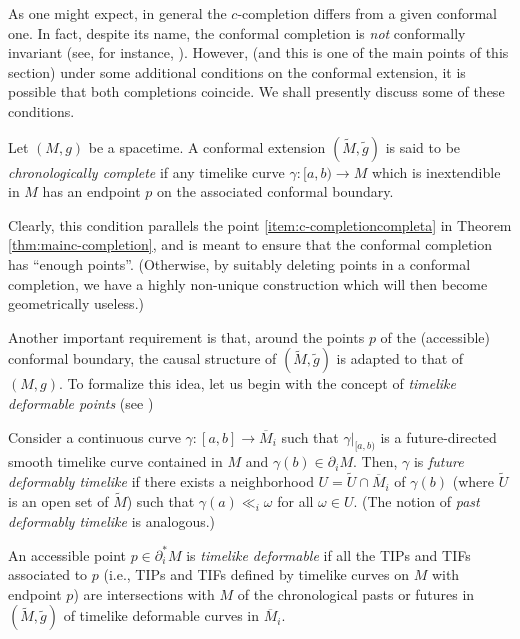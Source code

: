 \medskip

As one might expect, in general the $c$-completion differs from a given conformal one. In fact, despite its name, the conformal completion is {\em not} conformally invariant (see, for instance, \cite[Figure 10]{Floresfinaldefinitioncausal2011}). However, (and this is one of the main points of this section) under some additional conditions on the conformal extension, it is possible that both completions coincide. We shall presently discuss some of these conditions.

\begin{definition}\label{def:chronologically complete}
Let $(M,g)$ be a spacetime. A conformal extension $(\tilde{M},\tilde{g})$ is said to be {\em chronologically complete} if any timelike curve $\gamma:[a,b)\rightarrow M$ which is inextendible in $M$ has an endpoint $p$ on the associated conformal boundary.
\end{definition}
Clearly, this condition parallels the point \ref{item:c-completioncompleta} in Theorem  \ref{thm:mainc-completion}, and is meant to ensure that the conformal completion has ``enough points''. (Otherwise, by suitably deleting points in a conformal completion, we have a highly non-unique construction which will then become geometrically useless.)

Another important requirement is that, around the points $p$ of the (accessible) conformal boundary, the causal structure of $(\tilde{M},\tilde{g})$ is adapted to that of $(M,g)$. To formalize this idea, let us begin with the concept of {\em timelike deformable points} (see \cite[Definition 4.10]{Floresfinaldefinitioncausal2011})

\begin{definition}\label{def:deformable}
Consider a continuous curve $\gamma:[a,b]\rightarrow \overline{M}_i$ such that $\gamma|_{[a,b)}$ is a future-directed smooth timelike curve contained in $M$ and $\gamma(b)\in \partial_i M$. Then, $\gamma$ is {\em future deformably timelike} if there exists a neighborhood $U=\tilde{U}\cap \overline{M}_i$ of $\gamma(b)$ (where $\tilde{U}$ is an open set of $\tilde{M}$) such that $\gamma(a)\ll_i \omega$ for all $\omega\in U$. (The notion of {\em past deformably timelike} is analogous.)

  An accessible point $p\in \partial_i^* M$ is {\em timelike deformable} if all the TIPs and TIFs associated to $p$ (i.e., TIPs and TIFs defined by timelike curves on $M$ with endpoint $p$) are intersections with $M$ of the chronological pasts or futures in $(\tilde{M},\tilde{g})$ of timelike deformable curves in $\overline{M}_i$.
\end{definition}


